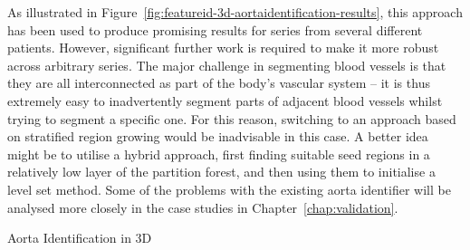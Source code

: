 As illustrated in Figure~\ref{fig:featureid-3d-aortaidentification-results}, this approach has been used to produce promising results for series from several different patients. However, significant further work is required to make it more robust across arbitrary series. The major challenge in segmenting blood vessels is that they are all interconnected as part of the body's vascular system -- it is thus extremely easy to inadvertently segment parts of adjacent blood vessels whilst trying to segment a specific one. For this reason, switching to an approach based on stratified region growing would be inadvisable in this case. A better idea might be to utilise a hybrid approach, first finding suitable seed regions in a relatively low layer of the partition forest, and then using them to initialise a level set method. Some of the problems with the existing aorta identifier will be analysed more closely in the case studies in Chapter~\ref{chap:validation}.

\begin{stulisting}[p]
\caption{Aorta Identification in 3D}
\label{code:featureid-3d-aortaidentification}

\end{stulisting}

